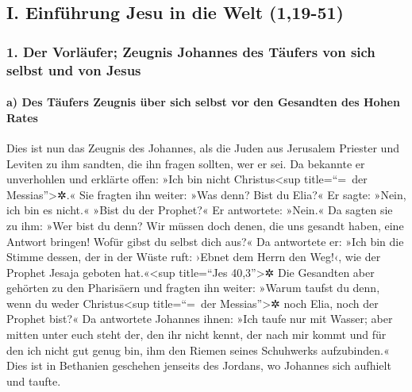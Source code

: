 \hypertarget{i.-einfuxfchrung-jesu-in-die-welt-119-51}{%
\subsection{I. Einführung Jesu in die Welt
(1,19-51)}\label{i.-einfuxfchrung-jesu-in-die-welt-119-51}}

\hypertarget{der-vorluxe4ufer-zeugnis-johannes-des-tuxe4ufers-von-sich-selbst-und-von-jesus}{%
\subsubsection{1. Der Vorläufer; Zeugnis Johannes des Täufers von sich
selbst und von
Jesus}\label{der-vorluxe4ufer-zeugnis-johannes-des-tuxe4ufers-von-sich-selbst-und-von-jesus}}

\hypertarget{a-des-tuxe4ufers-zeugnis-uxfcber-sich-selbst-vor-den-gesandten-des-hohen-rates}{%
\paragraph{a) Des Täufers Zeugnis über sich selbst vor den Gesandten des
Hohen
Rates}\label{a-des-tuxe4ufers-zeugnis-uxfcber-sich-selbst-vor-den-gesandten-des-hohen-rates}}

 Dies ist nun das Zeugnis des Johannes, als die Juden aus
Jerusalem Priester und Leviten zu ihm sandten, die ihn fragen sollten,
wer er sei.  Da bekannte er unverhohlen und erklärte
offen: »Ich bin nicht Christus\textless sup title=``=~der
Messias''\textgreater✲.«  Sie fragten ihn weiter: »Was
denn? Bist du Elia?« Er sagte: »Nein, ich bin es nicht.« »Bist du der
Prophet?« Er antwortete: »Nein.«  Da sagten sie zu ihm:
»Wer bist du denn? Wir müssen doch denen, die uns gesandt haben, eine
Antwort bringen! Wofür gibst du selbst dich aus?«  Da
antwortete er: »Ich bin die Stimme dessen, der in der Wüste ruft: ›Ebnet
dem Herrn den Weg!‹, wie der Prophet Jesaja geboten hat.«\textless sup
title=``Jes 40,3''\textgreater✲  Die Gesandten aber
gehörten zu den Pharisäern  und fragten ihn weiter:
»Warum taufst du denn, wenn du weder Christus\textless sup title=``=~der
Messias''\textgreater✲ noch Elia, noch der Prophet bist?«
 Da antwortete Johannes ihnen: »Ich taufe nur mit Wasser;
aber mitten unter euch steht der, den ihr nicht kennt, 
der nach mir kommt und für den ich nicht gut genug bin, ihm den Riemen
seines Schuhwerks aufzubinden.«  Dies ist in Bethanien
geschehen jenseits des Jordans, wo Johannes sich aufhielt und taufte.

